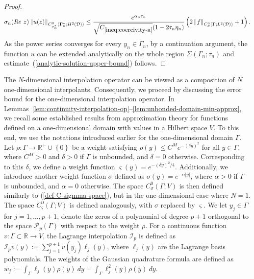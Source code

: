 \documentclass[final,onefignum,onetabnum]{mousaviart}
\begin{document}
\begin{proof}
			\begin{equation*}
				\sigma_n(Re~ z) \left\| u(z) \right\|_{C^0_{\sigma_n^*}\left( \boldsymbol{\Gamma}_n^*; H^2(\mathcal{D}) \right)}  
				\leq \dfrac{e^{\alpha_n \tau_n}}{\sqrt{C_{\ref{ineq:coercivity-a}}}(1-2\tau_n \eta_n)}
				\left( 2 \left\| f\right\|_{C^0_\sigma(\boldsymbol{\Gamma}; L^2(\mathcal{D}))} + 1 \right). 
			\end{equation*}
			As the power series converges for every $y_n \in \Gamma_n$, by a continuation argument, the function $u$ can be extended analytically on the whole region $\Sigma(\Gamma_n; \tau_n)$ and estimate~(\ref{analytic-solution-upper-bound}) follows.
		\end{proof}
		
		\vspace*{1mm}
		The $N$-dimensional interpolation operator can be viewed as a composition of $N$ one-dimensional interpolants. 
		Consequently, we proceed by discussing the error bound for the one-dimensional interpolation operator. 
		In Lemmas~\ref{lem:continuity-interpolation-op}–\ref{lem:unbonded-domain-min-approx}, we recall some established results from approximation theory for functions defined on a one-dimensional domain with values in a Hilbert space $V$. 
		To this end, we use the notations introduced earlier for the one-dimensional domain $\Gamma$. 
		Let $\rho: \Gamma \rightarrow \mathbb{R}^+ \cup \left\lbrace 0\right\rbrace $ be a weight satisfying $\rho(y) \leq C^{M}e^{-(\delta y)^2}$ for all $ y \in \Gamma$, where $C^{M} > 0$ and $\delta>0$ if $\Gamma$ is unbounded, and $\delta = 0$ otherwise. 
		Corresponding to this $\delta$, we define a weight function $\varsigma(y)= e^{-{(\delta y)^2}/{4}}$. 
		Additionally, we introduce another weight function $\sigma$ defined as $\sigma(y)=e^{-\alpha |y|}$, where $\alpha>0$ if $\Gamma$ is unbounded, and $\alpha = 0$ otherwise. The space $C^0_\sigma\left( \Gamma; V \right)$ is then defined similarly to (\ref{def-C-sigmma-space}), but in the one-dimensional case where $N=1$. 
		The space $C^0_\varsigma\left( \Gamma; V \right)$ is defined analogously, with $\sigma$ replaced by $\varsigma$. We let $y_j \in \Gamma$ for $j= 1,\dots, p+1$, denote the zeros of a polynomial of degree $p+1$ orthogonal to the space $\mathcal{P}_p(\Gamma)$ with respect to the weight $\rho$. 
		For a continuous function $v:\Gamma \subset \mathbb{R} \rightarrow V $, the Lagrange interpolation $\mathcal{I}_p$ is defined as $\mathcal{I}_pv(y):=\sum_{j=1}^{p+1}v(y_j) \ell_j (y)$, where $\ell_j (y)$ are the Lagrange basis polynomials. 
		The weights of the Gaussian quadrature formula are defined as  $w_j:= \int_{\Gamma}\ell_j(y) \rho(y)~dy = \int_{\Gamma}\ell_j^2(y) \rho(y)~dy$. 
\end{document}
